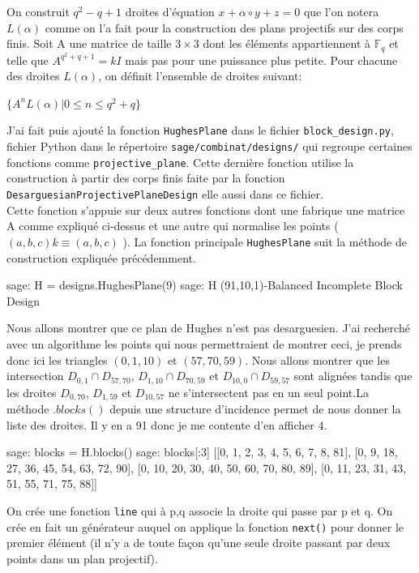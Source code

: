 \documentclass[a4paper]{article}
\begin{document}
        On construit $q^2-q+1$ droites d'équation $x + \alpha \circ y + z = 0$ que l'on notera $L(\alpha)$ comme on l'a fait pour la construction des plans projectifs sur des corps finis. Soit A une matrice de taille $3\times3$ dont les éléments appartiennent à $\mathbb{F}_q$ et telle que $A^{q^2+q+1}=kI$ mais pas pour une puissance plus petite. Pour chacune des droites $L(\alpha)$, on définit l'ensemble de droites suivant:
\begin{center}
 $ \{A^nL(\alpha) | 0 \leq n \leq q^2 + q\}$
\end{center}
\smallskip
J'ai fait puis ajouté la fonction \texttt{HughesPlane} dans le fichier \texttt{block\_design.py}, fichier Python dans le répertoire \texttt{sage/combinat/designs/} qui regroupe certaines fonctions comme \texttt{projective\_plane}. Cette dernière fonction utilise la construction à partir des corps finis faite par la fonction \\ \texttt{DesarguesianProjectivePlaneDesign} elle aussi dans ce fichier.\\
\newpage
Cette fonction s'appuie sur deux autres fonctions dont une fabrique une matrice A comme expliqué ci-dessus et une autre qui normalise les points ( $(a,b,c)k \equiv (a,b,c)$ ). La fonction principale \texttt{HughesPlane} suit la méthode de construction expliquée précédemment.
\begin{sageverbatim}
 sage: H = designs.HughesPlane(9)
 sage: H
 (91,10,1)-Balanced Incomplete Block Design
\end{sageverbatim}
Nous allons montrer que ce plan de Hughes n'est pas desarguesien. J'ai recherché avec un algorithme les points qui nous permettraient de montrer ceci, je prends donc ici les triangles $(0,1,10)$ et $(57, 70, 59)$. Nous allons montrer que les intersection $D_{0,1} \cap D_{57,70}$, $D_{1,10} \cap D_{70,59}$ et $D_{10,0} \cap D_{59,57}$ sont alignées tandis que les droites $D_{0,70}$, $D_{1,59}$ et $D_{10,57}$ ne s'intersectent pas en un seul point.La méthode $.blocks()$ depuis une structure d'incidence permet de nous donner la liste des droites. Il y en a 91 donc je me contente d'en afficher 4.
\begin{sageverbatim}
 sage: blocks = H.blocks()
 sage: blocks[:3]
 [[0, 1, 2, 3, 4, 5, 6, 7, 8, 81],
 [0, 9, 18, 27, 36, 45, 54, 63, 72, 90],
 [0, 10, 20, 30, 40, 50, 60, 70, 80, 89],
 [0, 11, 23, 31, 43, 51, 55, 71, 75, 88]]
\end{sageverbatim}
On crée une fonction \texttt{line} qui à p,q associe la droite qui passe par p et q. On crée en fait un générateur auquel on applique la fonction \texttt{next()} pour donner le premier élément (il n'y a de toute façon qu'une seule droite passant par deux points dans un plan projectif).
\end{document}
